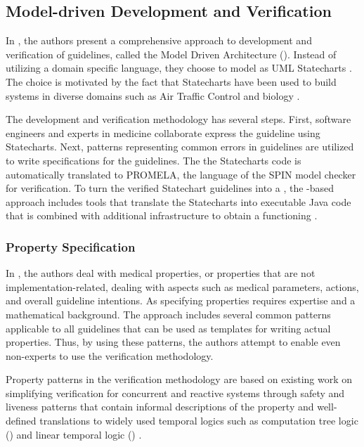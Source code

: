 \subsection{Model-driven Development and Verification}\label{sec:mda-verification}

In \cite{PerezJBI10}, the authors present a comprehensive approach
to development and verification of guidelines, called the Model Driven
Architecture (\MDA{}). Instead of
utilizing a domain specific language, they choose to model \BPGs{}
as UML Statecharts \cite{OMGSpecUrl}. The choice is motivated by
the fact that Statecharts have been used to build systems in diverse
domains such as Air Traffic Control \cite{WhittleICSE02} and biology
\cite{EfroniGR03}.

The development and verification methodology has several steps.
First, software engineers and experts in medicine collaborate
express the guideline using Statecharts. Next, patterns
representing common errors in guidelines are utilized to
write specifications for the guidelines. The
the Statecharts code is automatically translated to PROMELA,
the language of the SPIN model checker \cite{MikkISFST98} for verification.
To turn the verified Statechart guidelines into a \CDSS{}, the
\MDA{}-based approach includes tools that translate the Statecharts into
executable Java code that is combined with additional infrastructure to
obtain a functioning \CDSS{}.

\subsubsection{Property Specification}

In \cite{PerezJBI10}, the authors deal with
medical properties, or properties that are not implementation-related,
dealing with aspects such as  medical parameters, \HCP{} actions,
and overall guideline intentions. As specifying properties
requires expertise and a mathematical background. The \MDA{}
approach includes several common patterns applicable
to all guidelines that can be
used as templates for writing actual properties. Thus,
by using these patterns, the authors attempt
to enable even non-experts to use the \MDA{} verification
methodology.

Property patterns in the \MDA{} verification methodology
are based on existing work on simplifying verification for
concurrent and reactive systems through safety and liveness patterns
that contain informal descriptions of the property and
well-defined translations to widely used temporal logics such
as computation tree logic (\CTL{}) and linear temporal logic (\LTL{})
\cite{DwyerFM98,DwyerICSE98,BitschSAFECOMP01,RyndinaThesis05}.

